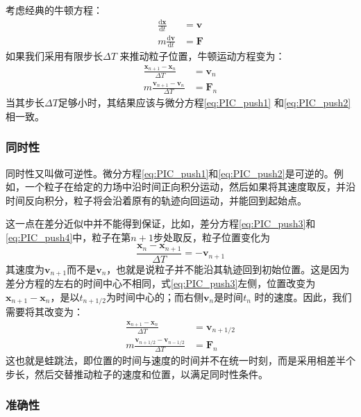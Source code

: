 {      考虑经典的牛顿方程：
      \begin{align}
        \label{eq:PIC_push1}
         \frac{\mathrm{d} \mathbf{x}}{\mathrm{d} t} &= \mathbf{v}  \\
        \label{eq:PIC_push2}
        m\frac{\mathrm{d} \mathbf{v}}{\mathrm{d} t} &= \mathbf{F}
      \end{align}
      如果我们采用有限步长$\Delta T$ 来推动粒子位置，牛顿运动方程变为：
      \begin{align}
         \label{eq:PIC_push3}
         \frac{\mathbf{x}_{n+1}-\mathbf{x}_n}{\Delta T} &= \mathbf{v}_n  \\
         \label{eq:PIC_push4}
          m\frac{\mathbf{v}_{n+1}-\mathbf{v}_n}{\Delta T} &= \mathbf{F}_n
      \end{align}
      当其步长$\Delta T$足够小时，其结果应该与微分方程\ref{eq:PIC_push1} 和\ref{eq:PIC_push2}相一致。
\subsubsection{同时性}
      同时性又叫做可逆性。微分方程\ref{eq:PIC_push1}和\ref{eq:PIC_push2}是可逆的。例如，一个粒子在给定的力场中沿时间正向积分运动，然后如果将其速度取反，并沿时间反向积分，粒子将会沿着原有的轨迹向回运动，并能回到起始点。

      这一点在差分近似中并不能得到保证，比如，差分方程\ref{eq:PIC_push3}和\ref{eq:PIC_push4}中，粒子在第$n+1$步处取反，粒子位置变化为
      \begin{equation}
         \label{eq:PIC_push5}
         \frac{\mathbf{x}_{n}-\mathbf{x}_{n+1}}{\Delta T} = -\mathbf{v}_{n+1}
      \end{equation}
      其速度为$\mathbf{v}_{n+1}$而不是$\mathbf{v}_{n}$，也就是说粒子并不能沿其轨迹回到初始位置。这是因为差分方程的左右的时间中心不相同，式\ref{eq:PIC_push3}左侧，位置改变为$\mathbf{x}_{n+1}-\mathbf{x}_n$，是以$t_{n+1/2}$为时间中心的；而右侧$\mathbf{v}_n$是时间$t_{n}$ 时的速度。因此，我们需要将其改变为：
      \begin{align}
         \label{eq:PIC_push6}
         \frac{\mathbf{x}_{n+1}-\mathbf{x}_n}{\Delta T} &= \mathbf{v}_{n+1/2}  \\
         \label{eq:PIC_push7}
          m\frac{\mathbf{v}_{n+1/2}-\mathbf{v}_{n-1/2}}{\Delta T} &= \mathbf{F}_n
      \end{align}
      这也就是蛙跳法，即位置的时间与速度的时间并不在统一时刻，而是采用相差半个步长，然后交替推动粒子的速度和位置，以满足同时性条件。
\subsubsection{准确性}

}
